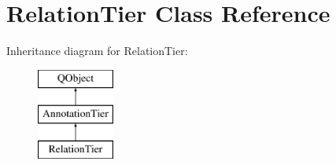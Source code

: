 \hypertarget{class_relation_tier}{}\section{Relation\+Tier Class Reference}
\label{class_relation_tier}
Inheritance diagram for Relation\+Tier\+:\begin{figure}[H]
\begin{center}
\leavevmode
\includegraphics[height=3.000000cm]{class_relation_tier}
\end{center}
\end{figure}
